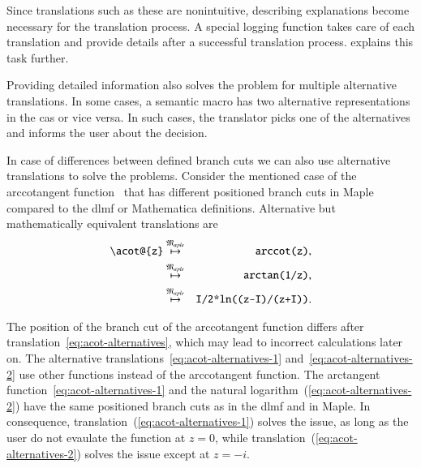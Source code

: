 \documentclass[a4paper,11pt]{article}
\newcommand{\Maple}{Maple}
\newcommand{\Mathematica}{Mathematica}
\newcommand{\langMaple}{\mathfrak{M}_{aple}}
\theoremstyle{defTheoStyle}
\theoremstyle{defExampStyle}
\DeclareRobustCommand{\iunit}{{i}}
\begin{document}
\vspace{-0.2cm}
Since translations such as these are nonintuitive, describing explanations become necessary for the translation process. A special logging function takes care of each translation and provide details after a successful translation process.  explains this task further.

Providing detailed information also solves the problem for multiple alternative translations. In some cases, a semantic macro has two alternative representations in the \gls*{cas} or vice versa. In such cases, the translator picks one of the alternatives and informs the user about the decision.

In case of differences between defined branch cuts we can also use alternative translations to solve the problems. Consider the mentioned case of the arccotangent function~\parencite{Branches:acot} that has different positioned branch cuts in \Maple{} compared to the \gls*{dlmf} or \Mathematica{} definitions. Alternative but mathematically equivalent translations are
\begin{eqnarray}
\verb|\acot@{z}| & \overset{\langMaple}{\mapsto} & \verb|arccot(z)|,\label{eq:acot-alternatives}\\
& \overset{\langMaple}{\mapsto} & \verb|arctan(1/z)|,\label{eq:acot-alternatives-1}\\
& \overset{\langMaple}{\mapsto} & \verb|I/2*ln((z-I)/(z+I))|.\label{eq:acot-alternatives-2}
\end{eqnarray}

\vspace{-0.2cm}
The position of the branch cut of the arccotangent function differs after translation~\eqref{eq:acot-alternatives}, which may lead to incorrect calculations later on. The alternative translations~\eqref{eq:acot-alternatives-1} and~\eqref{eq:acot-alternatives-2} use other functions instead of the arccotangent function. The arctangent function~\eqref{eq:acot-alternatives-1} and the natural logarithm~(\ref{eq:acot-alternatives-2}) have the same positioned branch cuts as in the \gls*{dlmf} and in \Maple. In consequence, translation~(\ref{eq:acot-alternatives-1}) solves the issue, as long as the user do not evaulate the function at $z = 0$, while translation~(\ref{eq:acot-alternatives-2}) solves the issue except at $z = -\iunit$.
\end{document}
